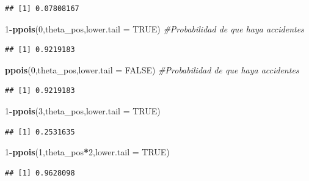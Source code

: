 \documentclass[
]{article}
\newenvironment{Shaded}{\begin{snugshade}}{\end{snugshade}}
\newcommand{\AttributeTok}[1]{\textcolor[rgb]{0.13,0.29,0.53}{#1}}
\newcommand{\CommentTok}[1]{\textcolor[rgb]{0.56,0.35,0.01}{\textit{#1}}}
\newcommand{\ConstantTok}[1]{\textcolor[rgb]{0.56,0.35,0.01}{#1}}
\newcommand{\DecValTok}[1]{\textcolor[rgb]{0.00,0.00,0.81}{#1}}
\newcommand{\FunctionTok}[1]{\textcolor[rgb]{0.13,0.29,0.53}{\textbf{#1}}}
\newcommand{\NormalTok}[1]{#1}
\newcommand{\SpecialCharTok}[1]{\textcolor[rgb]{0.81,0.36,0.00}{\textbf{#1}}}
\begin{document}
\begin{verbatim}
## [1] 0.07808167
\end{verbatim}

\begin{Shaded}
\begin{Highlighting}[]
\DecValTok{1}\SpecialCharTok{{-}}\FunctionTok{ppois}\NormalTok{(}\DecValTok{0}\NormalTok{,theta\_pos,}\AttributeTok{lower.tail =} \ConstantTok{TRUE}\NormalTok{) }\CommentTok{\#Probabilidad de que haya accidentes}
\end{Highlighting}
\end{Shaded}

\begin{verbatim}
## [1] 0.9219183
\end{verbatim}

\begin{Shaded}
\begin{Highlighting}[]
\FunctionTok{ppois}\NormalTok{(}\DecValTok{0}\NormalTok{,theta\_pos,}\AttributeTok{lower.tail =} \ConstantTok{FALSE}\NormalTok{) }\CommentTok{\#Probabilidad de que haya accidentes}
\end{Highlighting}
\end{Shaded}

\begin{verbatim}
## [1] 0.9219183
\end{verbatim}

\begin{Shaded}
\begin{Highlighting}[]
\DecValTok{1}\SpecialCharTok{{-}}\FunctionTok{ppois}\NormalTok{(}\DecValTok{3}\NormalTok{,theta\_pos,}\AttributeTok{lower.tail =} \ConstantTok{TRUE}\NormalTok{)}
\end{Highlighting}
\end{Shaded}

\begin{verbatim}
## [1] 0.2531635
\end{verbatim}

\begin{Shaded}
\begin{Highlighting}[]
\DecValTok{1}\SpecialCharTok{{-}}\FunctionTok{ppois}\NormalTok{(}\DecValTok{1}\NormalTok{,theta\_pos}\SpecialCharTok{*}\DecValTok{2}\NormalTok{,}\AttributeTok{lower.tail =} \ConstantTok{TRUE}\NormalTok{)}
\end{Highlighting}
\end{Shaded}

\begin{verbatim}
## [1] 0.9628098
\end{verbatim}
\end{document}
